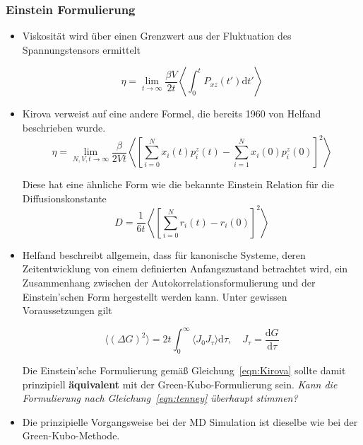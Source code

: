 \documentclass[a4paper, 10pt, 
               numbers=noenddot, toc=graduated,
               headsepline=true, footsepline=true,
               twoside=false, titlepage=true, 
               bibliography=totoc]{scrartcl}
\newcommand{\refeqn}[1]  {Gleichung~\ref{#1}}
\begin{document}
	\subsubsection{Einstein Formulierung}
		\begin{itemize}
			 \item Viskosität wird über einen Grenzwert aus der Fluktuation des Spannungstensors ermittelt \cite{Tenney2010}
			 
			 	\begin{equation}\label{eqn:tenney}
					\eta = \lim_{t\to\infty} \frac{\beta V}{2 t} \left\langle \int_0^t P_{xz}(t')\mathrm{d}t' \right\rangle
				\end{equation}
				
			 \item Kirova \cite{Kirova2015} verweist auf eine andere Formel, die bereits 1960 von Helfand \cite{Helfand1960} beschrieben wurde.
			    \begin{equation}\label{eqn:Kirova}
					\eta = \lim_{N,V,t\to\infty} \frac{\beta}{2 V t} \left\langle \left[\sum_{i=0}^N x_i(t) p_i^z(t) - \sum_{i=1}^N x_i(0) p_i^z(0) \right]^2 \right\rangle
				\end{equation}
				
				Diese hat eine ähnliche Form wie die bekannte Einstein Relation für die Diffusionskonstante
				\begin{equation}
					D = \frac{1}{6t} \left\langle \left[ \sum_{i=0}^N r_i(t) - r_i(0) \right]^2 \right\rangle
				\end{equation}
				
			\item Helfand \cite{Helfand1960} beschreibt allgemein, dass für kanonische Systeme, deren Zeitentwicklung von einem definierten Anfangszustand betrachtet wird, ein Zusammenhang zwischen der Autokorrelationsformulierung und der Einstein'schen Form hergestellt werden kann. Unter gewissen Voraussetzungen gilt
			
				\begin{equation}
					\langle (\Delta G)^2 \rangle = 2 t \int_0^\infty \langle J_0 J_\tau \rangle \mathrm{d} \tau,\quad J_\tau = \frac{ \mathrm{d} G }{\mathrm{d} \tau}
				\end{equation}
				
				Die Einstein'sche Formulierung gemäß \refeqn{eqn:Kirova} sollte damit prinzipiell \textbf{äquivalent} mit der Green-Kubo-Formulierung sein. \textit{Kann die Formulierung nach \refeqn{eqn:tenney} überhaupt stimmen?}
				
			 
			 \item Die prinzipielle Vorgangsweise bei der MD Simulation ist dieselbe wie bei der Green-Kubo-Methode.
		\end{itemize}
\end{document}
